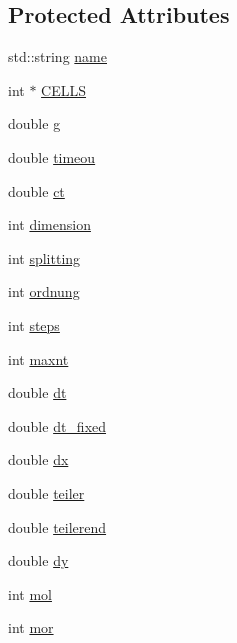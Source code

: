 \subsection*{Protected Attributes}
\begin{DoxyCompactItemize}
\item 
std\-::string \hyperlink{classnumerische__methode_a08429f7cae828958ced4b62db2cf1021}{name}
\item 
int $\ast$ \hyperlink{classnumerische__methode_a896a9488a1b7593e4312fa102264c280}{C\-E\-L\-L\-S}
\item 
double \hyperlink{classnumerische__methode_a8adb2a525c7877c531fa960ee5f0176b}{g}
\item 
double \hyperlink{classnumerische__methode_af0e0a81815451c4ed37f0ad73d4c5dbe}{timeou}
\item 
double \hyperlink{classnumerische__methode_aec540b2a47bbc7318f511583087c5498}{ct}
\item 
int \hyperlink{classnumerische__methode_a5a52e194b395d083422d9b03e72d3d5f}{dimension}
\item 
int \hyperlink{classnumerische__methode_a70e5afff7bb50109856ce5bf2e62f072}{splitting}
\item 
int \hyperlink{classnumerische__methode_ab95e5de8e6d9d0a63e4110dea60825e8}{ordnung}
\item 
int \hyperlink{classnumerische__methode_a4c5bac9002b5bc6ab4c5eac30943246a}{steps}
\item 
int \hyperlink{classnumerische__methode_ae52e51b4b4607ee26d4cc9bac2f61922}{maxnt}
\item 
double \hyperlink{classnumerische__methode_a073f2f281300eebad11d25e6a2e4a481}{dt}
\item 
double \hyperlink{classnumerische__methode_a4f188b1788413cb68a14dbe1d8a5846a}{dt\-\_\-fixed}
\item 
double \hyperlink{classnumerische__methode_af35cb44a6bdcfed96bdcee642aa7f67e}{dx}
\item 
double \hyperlink{classnumerische__methode_ae3738842c0b0203293161f8389454227}{teiler}
\item 
double \hyperlink{classnumerische__methode_af29a77417f125560c1797aed70cd7ad5}{teilerend}
\item 
double \hyperlink{classnumerische__methode_a6668ec54293e469ff9c169dfbb72e3d4}{dy}
\item 
int \hyperlink{classnumerische__methode_a6ffb8741f1f1d5975994cb006d436d8f}{mol}
\item 
int \hyperlink{classnumerische__methode_ab33e0205421976197d24355cf010bfe8}{mor}

\end{DoxyCompactItemize}
